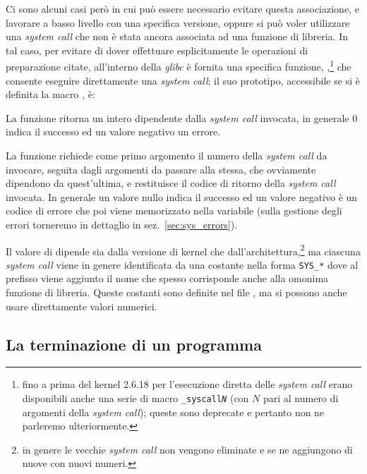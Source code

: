 Ci sono alcuni casi però in cui può essere necessario evitare questa
associazione, e lavorare a basso livello con una specifica versione, oppure si
può voler utilizzare una \textit{system call} che non è stata ancora associata
ad una funzione di libreria.  In tal caso, per evitare di dover effettuare
esplicitamente le operazioni di preparazione citate, all'interno della
\textsl{glibc} è fornita una specifica funzione,
,\footnote{fino a prima del kernel 2.6.18 per l'esecuzione
  diretta delle \textit{system call} erano disponibili anche una serie di
  macro \texttt{\_syscall\textsl{N}} (con $N$ pari al numero di argomenti
  della \textit{system call}); queste sono deprecate e pertanto non ne
  parleremo ulteriormente.} che consente eseguire direttamente una
\textit{system call}; il suo prototipo, accessibile se si è definita la macro
, è:

\begin{funcproto}{
}
{La funzione ritorna un intero dipendente dalla \textit{system call} invocata,
 in generale $0$ indica il successo ed un valore negativo un errore.}
\end{funcproto}

La funzione richiede come primo argomento il numero della \textit{system call}
da invocare, seguita dagli argomenti da passare alla stessa, che ovviamente
dipendono da quest'ultima, e restituisce il codice di ritorno della
\textit{system call} invocata. In generale un valore nullo indica il successo
ed un valore negativo è un codice di errore che poi viene memorizzato nella
variabile  (sulla gestione degli errori torneremo in dettaglio in
sez.~\ref{sec:sys_errors}).

Il valore di  dipende sia dalla versione di kernel che
dall'architettura,\footnote{in genere le vecchie \textit{system call} non
  vengono eliminate e se ne aggiungono di nuove con nuovi numeri.}  ma
ciascuna \textit{system call} viene in genere identificata da una costante
nella forma \texttt{SYS\_*} dove al prefisso viene aggiunto il nome che spesso
corrisponde anche alla omonima funzione di libreria. Queste costanti sono
definite nel file , ma si possono anche usare
direttamente valori numerici.


\subsection{La terminazione di un programma}
\label{sec:proc_conclusion}

